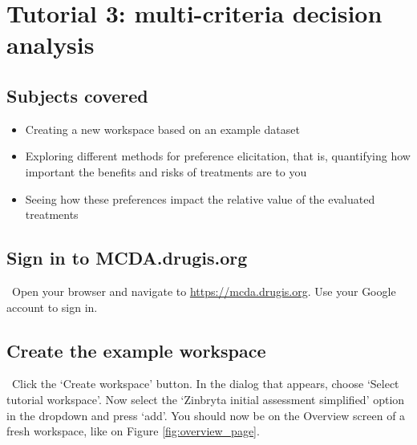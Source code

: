 \documentclass[00_mcda_tutorial.tex]{subfiles}
\begin{document}
\section*{Tutorial 3: multi-criteria decision analysis}
\addtocounter{section}{1}

\subsection*{Subjects covered}
\begin{itemize}
\item Creating a new workspace based on an example dataset
\item Exploring different methods for preference elicitation, that is, quantifying how important the benefits and risks of treatments are to you
\item Seeing how these preferences impact the relative value of the evaluated treatments
\end{itemize}

\subsection*{Sign in to MCDA.drugis.org}
\leftpointright \, Open your browser and navigate to \href{https://mcda.drugis.org}{https://mcda.drugis.org}. Use your Google account to sign in.

\subsection*{Create the example workspace}
\leftpointright \, Click the ‘Create workspace’ button. In the dialog that appears, choose ‘Select tutorial workspace’. Now select the ‘Zinbryta initial assessment simplified’ option in the dropdown and press ‘add’. You should now be on the Overview screen of a fresh workspace, like on Figure \ref{fig:overview_page}.
\newline
\end{document}
